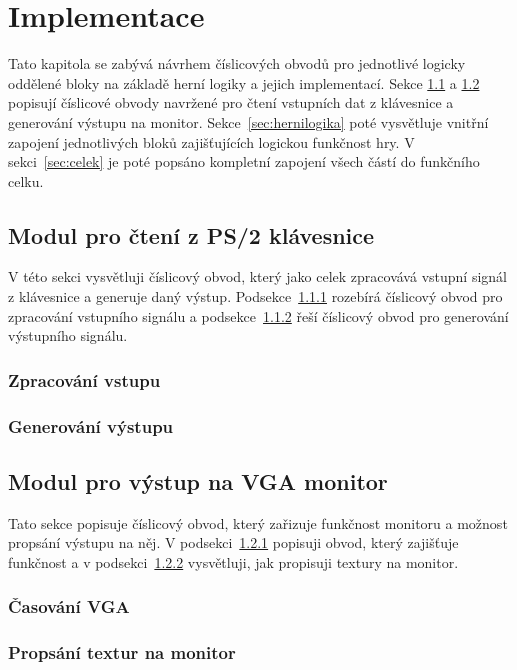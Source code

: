 \documentclass{report}
\begin{document}
\chapter{Implementace}
Tato kapitola se zabývá návrhem číslicových obvodů pro jednotlivé logicky oddělené bloky na základě herní logiky a jejich implementací. Sekce \ref{sec:ctenizps2} a \ref{sec:vystupnavga} popisují číslicové obvody navržené pro čtení vstupních dat z klávesnice a generování výstupu na monitor. Sekce~\ref{sec:hernilogika} poté vysvětluje vnitřní zapojení jednotlivých bloků zajišťujících logickou funkčnost hry. V sekci~\ref{sec:celek} je poté popsáno kompletní zapojení všech částí do funkčního celku.

\section{Modul pro čtení z PS/2 klávesnice}\label{sec:ctenizps2}
V této sekci vysvětluji číslicový obvod, který jako celek zpracovává vstupní signál z klávesnice a generuje daný výstup. Podsekce~\ref{sec:zpracovanivstupu} rozebírá číslicový obvod pro zpracování vstupního signálu a podsekce~\ref{sec:generovanivystupu} řeší číslicový obvod pro generování výstupního signálu.
\subsection{Zpracování vstupu}\label{sec:zpracovanivstupu}
\subsection{Generování výstupu}\label{sec:generovanivystupu}

\section{Modul pro výstup na VGA monitor}\label{sec:vystupnavga}
Tato sekce popisuje číslicový obvod, který zařizuje funkčnost monitoru a možnost propsání výstupu na něj. V podsekci~\ref{sec:casovanivga} popisuji obvod, který zajišťuje funkčnost a v podsekci~\ref{sec:propsanitextur} vysvětluji, jak propisuji textury na monitor.
\subsection{Časování VGA}\label{sec:casovanivga}
\subsection{Propsání textur na monitor}\label{sec:propsanitextur}
\end{document}
